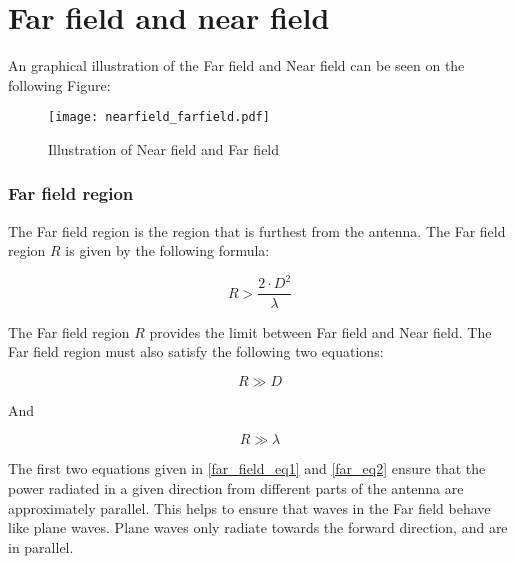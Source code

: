 \chapter{Far field and near field}

An graphical illustration of the Far field and Near field \citep{farnear_field1}\citep{farnear_field2} can be seen on the following Figure:

\begin{figure}[H]
\centering
\texttt{[image: nearfield\_farfield.pdf]}
\caption{Illustration of Near field and Far field \citep{farnear_field}}
\label{para_wave}
\end{figure}



\subsection{Far field region}

The Far field region is the region that is furthest from the antenna. The Far field region $R$ is given by the following formula:

\begin{equation}
R > \frac{2 \cdot D^{2}}{\lambda}
\label{far_field_eq1}
\end{equation}

\begin{where}
\end{where}

The Far field region $R$ provides the limit between Far field and Near field. The Far field region must also satisfy the following two equations:

\begin{equation}
R \gg D
\label{far_eq2}
\end{equation}

And

\begin{equation}
R \gg \lambda
\label{far_eq_3}
\end{equation}

The first two equations given in \ref{far_field_eq1} and \ref{far_eq2} ensure that the power radiated in a given direction from different parts of the antenna are approximately parallel. This helps to ensure that waves in the Far field behave like plane waves. Plane waves only radiate towards the forward direction, and are in parallel. %

